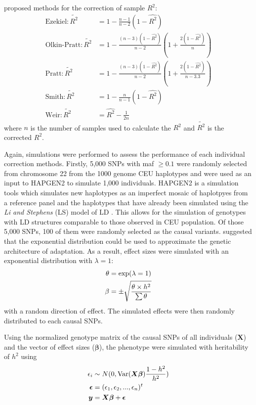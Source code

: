 		\citet{Weir1980,Wang2007} proposed methods for the correction of sample $R^2$:
		\begin{align}
		\text{Ezekiel}: \tilde{R^2}&= 1-\frac{n-1}{n-2}(1-\hat{R^2})\label{eq:ezekiel} \\
		\text{Olkin-Pratt}: \tilde{R^2}&=1-\frac{(n-3)(1-\hat{R^2})}{n-2}(1+\frac{2(1-\hat{R^2})}{n})\label{eq:okin} \\
		\text{Pratt}: \tilde{R^2}&=1-\frac{(n-3)(1-\hat{R^2})}{n-2}(1+\frac{2(1-\hat{R^2})}{n-3.3})\label{eq:pratt} \\
		\text{Smith}: \tilde{R^2}&=1-\frac{n}{n-1}(1-\hat{R^2}) \label{eq:smith}\\
		\text{Weir}: \tilde{R^2}&=\hat{R^2}-\frac{1}{2n} \label{eq:weir}
		\end{align}
		where $n$ is the number of samples used to calculate the $R^2$ and $\tilde{R^2}$ is the corrected $R^2$.
		
		Again, simulations were performed to assess the performance of each individual correction methods.
		Firstly, 5,000 \glspl{SNP} with \gls{maf} $\ge0.1$ were randomly selected from chromosome 22 from the 1000 genome \gls{CEU} haplotypes and were used as an input to HAPGEN2 \citep{Su2011} to simulate 1,000 individuals.
		HAPGEN2 is a simulation tools which simulates new haplotypes as an imperfect mosaic of haplotpyes from a reference panel and the haplotypes that have already been simulated using the \textit{Li and Stephens} (LS) model of \gls{LD} \citep{Li2003}.
		This allows for the simulation of genotypes with \gls{LD} structures comparable to those observed in \gls{CEU} population. 
		Of those 5,000 \glspl{SNP}, 100 of them were randomly selected as the causal variants. 
		\citet{Orr1998} suggested that the exponential distribution could be used to approximate the genetic architecture of adaptation. 
		As a result, effect sizes were simulated with an exponential distribution with $\lambda=1$:
		\begin{align}
		\theta&=\mathrm{exp}(\lambda=1)\notag\\
		\beta&=\pm\sqrt{\frac{\theta \times h^2}{\sum \theta}}
		\label{eq:randomEffect}
		\end{align}
		with a random direction of effect.
		The simulated effects were then randomly distributed to each causal \glspl{SNP}.
			
		Using the normalized genotype matrix of the causal \glspl{SNP} of all individuals ($\boldsymbol{X}$) and the vector of effect sizes ($\boldsymbol{\beta}$), the phenotype were simulated with heritability of $h^2$ using
		\begin{align}
		\epsilon_i&\sim N(0,\mathrm{Var}(\boldsymbol{X\beta})\frac{1-h^2}{h^2} )\notag\\
		\boldsymbol{\epsilon} &= (\epsilon_1,\epsilon_2,...,\epsilon_n)^t\notag\\
		\boldsymbol{y} &= \boldsymbol{X\beta}+\boldsymbol{\epsilon}
		\label{eq:simulationOfPhenotype}
		\end{align}
		
